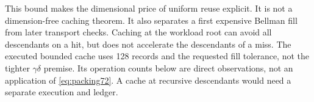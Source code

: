 This bound makes the dimensional price of uniform reuse explicit. It is not a dimension-free caching theorem. It also separates a first expensive Bellman fill from later transport checks. Caching at the workload root can avoid all descendants on a hit, but does not accelerate the descendants of a miss. The executed bounded cache uses 128 records and the requested fill tolerance, not the tighter $\gamma\delta$ premise. Its operation counts below are direct observations, not an application of \eqref{eq:packing72}. A cache at recursive descendants would need a separate execution and ledger.
